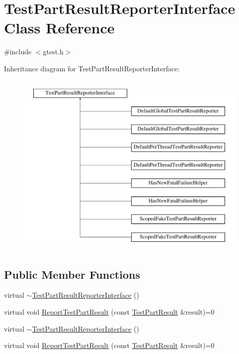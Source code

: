 \hypertarget{classtesting_1_1TestPartResultReporterInterface}{\section{\-Test\-Part\-Result\-Reporter\-Interface \-Class \-Reference}
\label{df/d70/classtesting_1_1TestPartResultReporterInterface}
}


{\ttfamily \#include $<$gtest.\-h$>$}

\-Inheritance diagram for \-Test\-Part\-Result\-Reporter\-Interface\-:\begin{figure}[H]
\begin{center}
\leavevmode
\includegraphics[height=9.000000cm]{df/d70/classtesting_1_1TestPartResultReporterInterface}
\end{center}
\end{figure}
\subsection*{\-Public \-Member \-Functions}
\begin{DoxyCompactItemize}
\item 
virtual \hyperlink{classtesting_1_1TestPartResultReporterInterface_aaed7a5d1c354f720bb9606382a7cbb53}{$\sim$\-Test\-Part\-Result\-Reporter\-Interface} ()
\item 
virtual void \hyperlink{classtesting_1_1TestPartResultReporterInterface_a49d731c71005e51d8531193f29efb71f}{\-Report\-Test\-Part\-Result} (const \hyperlink{classtesting_1_1TestPartResult}{\-Test\-Part\-Result} \&result)=0
\item 
virtual \hyperlink{classtesting_1_1TestPartResultReporterInterface_aaed7a5d1c354f720bb9606382a7cbb53}{$\sim$\-Test\-Part\-Result\-Reporter\-Interface} ()
\item 
virtual void \hyperlink{classtesting_1_1TestPartResultReporterInterface_a49d731c71005e51d8531193f29efb71f}{\-Report\-Test\-Part\-Result} (const \hyperlink{classtesting_1_1TestPartResult}{\-Test\-Part\-Result} \&result)=0
\end{DoxyCompactItemize}


